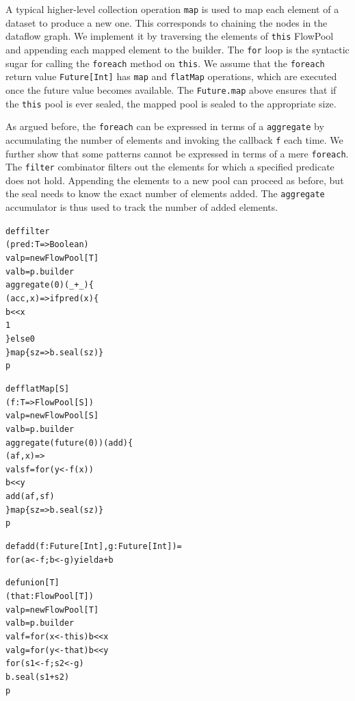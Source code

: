 \documentclass[runningheads,a4paper]{llncs}
\begin{document}
A typical higher-level collection operation \verb=map= is used to
map each element of a dataset to produce a new one.
This corresponds to chaining the nodes in the dataflow graph.
We implement it by traversing the elements of \verb=this= FlowPool and
appending each mapped element to the builder.
The \verb=for= loop is the syntactic sugar for calling the
\verb=foreach= method on \verb=this=.
We assume that the \verb=foreach= return value \verb=Future[Int]=
has \verb=map= and \verb=flatMap= operations, which are executed
once the future value becomes available.
The \verb=Future.map= above ensures that if the \verb=this= pool is ever
sealed, the mapped pool is sealed to the appropriate size.

As argued before, the \verb=foreach= can be expressed in terms of a
\verb=aggregate= by accumulating the number of elements and invoking the
callback \verb=f= each time.
We further show that some patterns cannot be expressed in terms of a mere
\verb=foreach=.
The \verb=filter= combinator filters out the elements for which a
specified predicate does not hold.
Appending the elements to a new pool can proceed as
before, but the seal needs to know the exact number of elements added.
The \verb=aggregate= accumulator is thus used to track the number
of added elements.

\noindent
\begin{minipage}[b]{4 cm}
\begin{alltt}
{\scriptsize
def filter
  (pred: T => Boolean)
  val p = new FlowPool[T]
  val b = p.builder
  aggregate(0)(_ + _) \{
    (acc, x) => if pred(x) \{
      b << x
      1
    \} else 0
  \} map \{ sz => b.seal(sz) \}
  p



}
\end{alltt}
\end{minipage}\begin{minipage}[b]{4 cm}
\begin{alltt}
{\scriptsize
def flatMap[S]
  (f: T => FlowPool[S])
  val p = new FlowPool[S]
  val b = p.builder
  aggregate(future(0))(add) \{
    (af, x) =>
    val sf = for (y <- f(x))
      b << y
    add(af, sf)
  \} map \{ sz => b.seal(sz) \}
  p

def add(f: Future[Int], g: Future[Int]) =
  for (a <- f; b <- g) yield a + b
}
\end{alltt}
\end{minipage}
\begin{minipage}[b]{4 cm}
\begin{alltt}
{\scriptsize
def union[T]
  (that: FlowPool[T])
  val p = new FlowPool[T]
  val b = p.builder
  val f = for (x <- this) b << x
  val g = for (y <- that) b << y
  for (s1 <- f; s2 <- g)
    b.seal(s1 + s2)
  p





}
\end{alltt}
\end{minipage}
\end{document}
